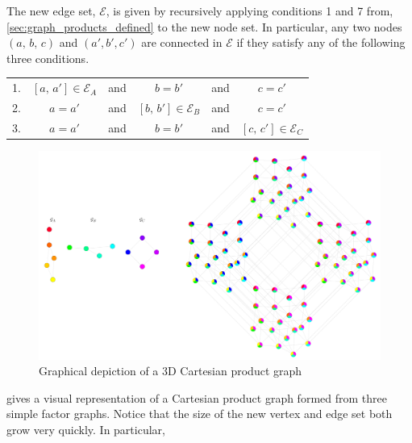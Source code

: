 The new edge set, $\mathcal{E}$, is given by recursively applying conditions 1 and 7 from, \cref{sec:graph_products_defined} to the new node set. In particular, any two nodes $(a, \, b, \, c)$ and $(a', b', c')$ are connected in $\mathcal{E}$ if they satisfy any of the following three conditions. 

\vspace{0.5cm}

\begin{table}[h]
    \def\arraystretch{1.5}
    \centering
    \begin{tabular}{lclclc}
        1. & $[a, \, a'] \in \mathcal{E}_A$    & and & $b = b'$  & and & $c = c'$             \\
        2. & $a = a'$    & and & $[b, \, b'] \in \mathcal{E}_B$   & and & $c = c'$             \\
        3. & $a = a'$    & and & $b = b'$  & and & $[c, \, c'] \in \mathcal{E}_C$              \\
    \end{tabular}
\end{table}


\begin{figure}[t]
    \begin{center}
        \includegraphics[width=\linewidth]{Figures/3D_CPG.pdf}
    \end{center}
    \caption[Graphical depiction of a 3D Cartesian product graph]{Graphical depiction of a 3D Cartesian product graph}
    \label{fig:3D_CPG}
\end{figure}

 gives a visual representation of a Cartesian product graph formed from three simple factor graphs. Notice that the size of the new vertex and edge set both grow very quickly. In particular, 

